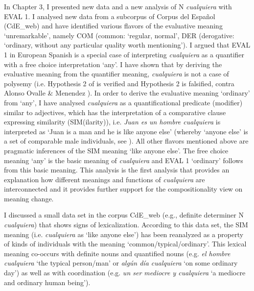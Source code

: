   In Chapter 3, I presented new data and a new analysis of N \textit{cualquiera} with EVAL 1. I analysed new data from a subcorpus of Corpus del Español (CdE\_web) and have identified various flavors of the evaluative meaning ‘unremarkable’, namely COM (common: ‘regular, normal’, DER (derogative: ‘ordinary, without any particular quality worth mentioning’). I argued that EVAL 1 in European Spanish is a special case of interpreting \textit{cualquiera} as a quantifier with a free choice interpretation ‘any’. I have shown that by deriving the evaluative meaning from the quantifier meaning, \textit{cualquiera} is not a case of polysemy (i.e. Hypothesis 2 of  is verified and Hypothesis 2 is falsified, contra Alonso Ovalle \& Menendez \citealt{Benito2018}). In order to derive the evaluative meaning ‘ordinary’ from ‘any’, I have analysed \textit{cualquiera} as a quantificational predicate (modifier) similar to adjectives, which has the interpretation of a comparative clause expressing similarity (SIM(ilarity)), i.e. \textit{Juan es un hombre cualquiera} is interpreted as ‘Juan is a man and he is like anyone else’ (whereby ‘anyone else’ is a set of comparable male individuals, see ). All other flavors mentioned above are pragmatic inferences of the SIM meaning ‘like anyone else’. The free choice meaning ‘any’ is the basic meaning of \textit{cualquiera} and EVAL 1 ‘ordinary’ follows from this basic meaning. This analysis is the first analysis that provides an explanation how different meanings and functions of \textit{cualquiera} are interconnected and it provides further support for the compositionality view on meaning change.

  I discussed a small data set in the corpus CdE\_web (e.g., definite determiner N \textit{cualquiera}) that shows signs of lexicalization. According to this data set, the SIM meaning (i.e. \textit{cualquiera} as ‘like anyone else’) has been reanalyzed as a property of kinds of individuals with the meaning ‘common/typical/ordinary’. This lexical meaning co-occurs with definite nouns and quantified nouns (e.g. \textit{el hombre cualquiera} ‘the typical person/man’ or \textit{algún día cualquiera} ‘on some ordinary day’) as well as with coordination (e.g. \textit{un ser mediocre y cualquiera} ‘a mediocre and ordinary human being’).

